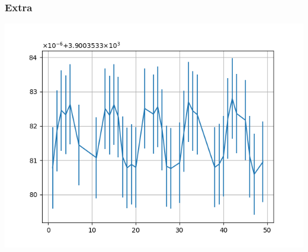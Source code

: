 \documentclass{beamer}
\begin{document}
\begin{frame}\frametitle{Extra}
  \begin{center}
    \includegraphics[height=.7\paperheight]{img/spin_axis_motion/moving_frame_freqs}
  \end{center}
\end{frame}
\end{document}
